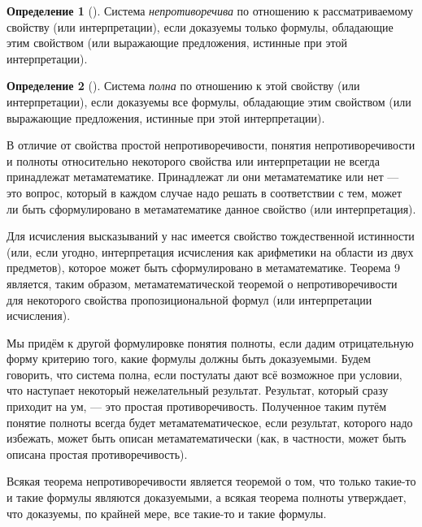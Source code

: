 \documentclass[a4paper, 12pt]{article}  %
\theoremstyle{definition}
\newtheorem*{definition}{Определение}
\begin{document}
	\begin{definition}[]
		 Система \textit{непротиворечива} по отношению к рассматриваемому свойству (или
		 интерпретации), если доказуемы только формулы, обладающие этим свойством (или выражающие
		 предложения, истинные при этой интерпретации).
	\end{definition}

	\begin{definition}[]
		Система \textit{полна} по отношению к этой свойству (или интерпретации), если доказуемы
		все формулы, обладающие этим свойством (или выражающие предложения, истинные при этой
		интерпретации).
	\end{definition}

	В отличие от свойства простой непротиворечивости, понятия непротиворечивости и полноты
	относительно некоторого свойства или интерпретации не всегда принадлежат метаматематике.
	Принадлежат ли они метаматематике или нет --- это вопрос, который в каждом случае надо решать
	в соответствии с тем, может ли быть сформулировано в метаматематике данное свойство (или
	интерпретация).
	
	Для исчисления высказываний у нас имеется свойство тождественной истинности (или, если угодно,
	интерпретация исчисления как арифметики на области из двух предметов), которое может быть
	сформулировано в метаматематике. Теорема 9 является, таким образом, метаматематической
	теоремой о непротиворечивости для некоторого свойства пропозициональной формул (или
	интерпретации исчисления).
	
	Мы придём к другой формулировке понятия полноты, если дадим отрицательную форму критерию того,
	какие формулы должны быть доказуемыми. Будем говорить, что система полна, если постулаты дают
	всё возможное при условии, что наступает некоторый нежелательный результат. Результат, который
	сразу приходит на ум, --- это простая противоречивость. Полученное таким путём понятие полноты
	всегда будет метаматематическое, если результат, которого надо избежать, может быть описан
	метаматематически (как, в частности, может быть описана простая противоречивость).
	
	Всякая теорема непротиворечивости является теоремой о том, что только такие-то и такие формулы
	являются доказуемыми, а всякая теорема полноты утверждает, что доказуемы, по крайней мере, все
	такие-то и такие формулы.
\end{document}
